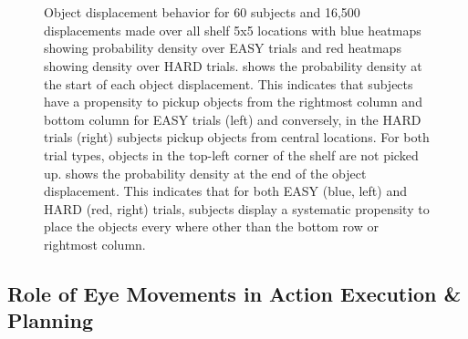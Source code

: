 \begin{figure}[h]
    \centering
    \\
    \\
    \caption[]{Object displacement behavior for 60 subjects and 16,500 displacements made over all shelf 5x5 locations with blue heatmaps showing probability density over EASY trials and red heatmaps showing density over HARD trials. \protect{} shows the probability density at the start of each object displacement. This indicates that subjects have a propensity to pickup objects from the rightmost column and bottom column for EASY trials (left) and conversely, in the HARD trials (right) subjects pickup objects from central locations. For both trial types, objects in the top-left corner of the shelf are not picked up. \protect{} shows the probability density at the end of the object displacement. This indicates that for both EASY (blue, left) and HARD (red, right) trials, subjects display a systematic propensity to place the objects every where other than the bottom row or rightmost column. }
    \label{figure:obj_displacement}
\end{figure}

\subsection{Role of Eye Movements in Action Execution \& Planning}

